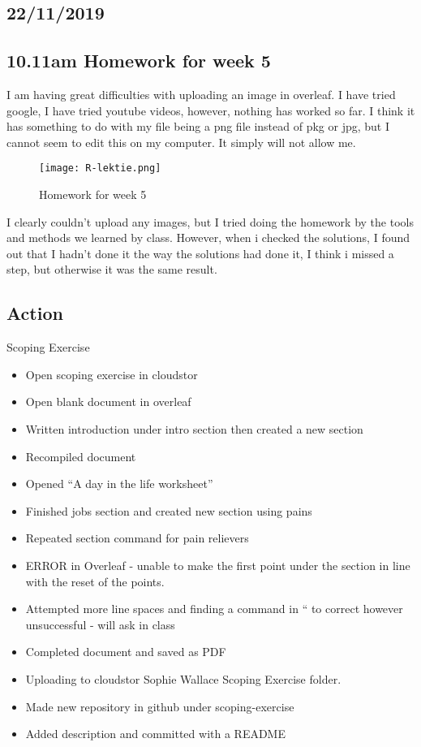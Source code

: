 \documentclass{article}
\begin{document}
\begin{itemize}
\section{22/11/2019}

\subsection{10.11am Homework for week 5}

I am having great difficulties with uploading an image in overleaf. I have tried google, I have tried youtube videos, however, nothing has worked so far. I think it has something to do with my file being a png file instead of pkg or jpg, but I cannot seem to edit this on my computer. It simply will not allow me. 

\begin{figure}[htp]
    \centering
    \texttt{[image: R-lektie.png]}
    \usepackage{graphicx}
    \caption{Homework for week 5}
    \label{R-scipt figure}
\end{figure}
I clearly couldn't upload any images, but I tried doing the homework by the tools and methods we learned by class. However, when i checked the solutions, I found out that I hadn't done it the way the solutions had done it, I think i missed a step, but otherwise it was the same result. 
\subsection{Action}

Scoping Exercise
\begin{itemize}
\item Open scoping exercise in cloudstor
\item Open blank document in overleaf
\item Written introduction under intro section then created a new section
\item Recompiled document 
\item Opened “A day in the life worksheet”
\item Finished jobs section and created new section using pains
\item Repeated section command for pain relievers
\item ERROR in Overleaf - unable to make the first point under the section in line with the reset of the points.
\item Attempted more line spaces and finding a command in “\” to correct however unsuccessful - will ask in class
\item Completed document and saved as PDF
\item Uploading to cloudstor Sophie Wallace Scoping Exercise folder.
\item Made new repository in github under scoping-exercise 
\item Added description and committed with a README
\end{itemize}



\end{itemize}
\end{document}
